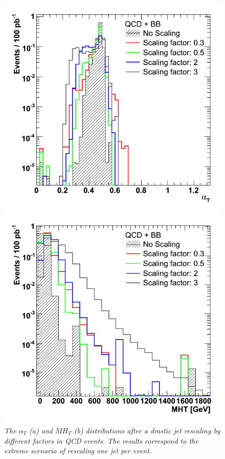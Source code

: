 \begin{figure}[h!]
\begin{minipage}[b]{0.5\linewidth}
\centering
\includegraphics[scale=0.37]{./plots/aT-NT7-Scaling.png} 
\end{minipage}
\begin{minipage}[b]{0.5\linewidth}
\centering
\includegraphics[scale=0.37]{./plots/MHT-NT7-Scaling.png} 
\end{minipage}
\caption{\textit{The $\alpha_{T}$ (a) and $MH_{T}$ (b) distributions after a drastic jet rescaling by different factors in QCD events. The results correspond to the extreme scenario of rescaling one jet per event.} }

\label{fig:scale1}
\end{figure}
